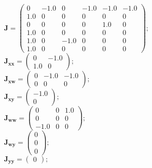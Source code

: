 \documentclass[11pt, oneside]{article}      %
\begin{document}
%
$ \mathbf{J} = \left(\begin{array}{cccccc}0 & -1.0 & 0 & -1.0 & -1.0 & -1.0\\1.0 & 0 & 0 & 0 & 0 & 0\\0 & 0 & 0 & 0 & 1.0 & 0\\1.0 & 0 & 0 & 0 & 0 & 0\\1.0 & 0 & -1.0 & 0 & 0 & 0\\1.0 & 0 & 0 & 0 & 0 & 0\end{array}\right) ; $ 
%
\\
%
$ \mathbf{J_{xx}} = \left(\begin{array}{cc}0 & -1.0\\1.0 & 0\end{array}\right) ; $ 
%
\\
%
$ \mathbf{J_{xw}} = \left(\begin{array}{ccc}0 & -1.0 & -1.0\\0 & 0 & 0\end{array}\right) ; $ 
%
\\
%
$ \mathbf{J_{xy}} = \left(\begin{array}{c}-1.0\\0\end{array}\right) ; $ 
%
\\
%
$ \mathbf{J_{ww}} = \left(\begin{array}{ccc}0 & 0 & 1.0\\0 & 0 & 0\\-1.0 & 0 & 0\end{array}\right) ; $ 
%
\\
%
$ \mathbf{J_{wy}} = \left(\begin{array}{c}0\\0\\0\end{array}\right) ; $ 
%
\\
%
$ \mathbf{J_{yy}} = \left(\begin{array}{c}0\end{array}\right) ; $ 
%
\\
%
\end{document}
